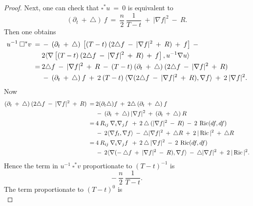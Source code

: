 \documentclass[12pt]{amsart}
\newcommand{\Ric}{\operatorname{Ric}}
\numberwithin{equation}{section}
\theoremstyle{plain}
\theoremstyle{definition}
\theoremstyle{remark}
\begin{document}
\begin{proof}
Next, one can check that $\square^* u \: = \: 0$ is equivalent to
\begin{equation}
(\partial_t \: + \: \triangle) \: f \: = \: \frac{n}{2} \: \frac{1}{T-t}
\: + \: |\nabla f|^2 \: - \: R.
\end{equation}
Then one obtains
\begin{align}
u^{-1} \: \square^* v \: = \: &
- \: (\partial_t \: + \: \triangle) \: \left[ (T - t) \:
(2 \triangle f \: - \: |\nabla f|^2 \: + \: R) \: + \: f \right] 
\: - \\
& 2 \langle \nabla \left[ (T - t) \:
(2 \triangle f \: - \: |\nabla f|^2 \: + \: R) \: + \: f \right], 
u^{-1} \nabla u \rangle \notag \\
\: = \: & 2 \triangle f \: - \: |\nabla f|^2 \: + \: R \: - \:
(T-t) \: (\partial_t \: + \: \triangle) \: 
(2 \triangle f \: - \: |\nabla f|^2 \: + \: R) \notag \\
&- \: 
(\partial_t \: + \: \triangle) \: f  \: + \:
2 \: (T-t) \: \langle \nabla
(2 \triangle f \: - \: |\nabla f|^2 \: + \: R), 
\nabla f \rangle \: + \: 2 \: |\nabla f|^2. \notag
\end{align}
Now
\begin{align}
(\partial_t \: + \: \triangle) \: 
(2 \triangle f \: - \: |\nabla f|^2 \: + \: R) \: = \:
& 2 (\partial_t \triangle) f \: + \: 2 \triangle \:
(\partial_t \: + \: \triangle) \: f \\
& - \: (\partial_t \: + \: \triangle) \: |\nabla f|^2 \: + \: 
(\partial_t \: + \: \triangle) \: R \notag \\
 \: = \: & 4 \: R_{ij} \: \nabla_i \nabla_j f \: \: + \:
2 \: \triangle \: (|\nabla f|^2 \: - \: R) \: - \: 2 \:
\Ric(df, df) \notag \\
& - \: 2 \langle \nabla f_t, \nabla f \rangle \: - \:
\triangle |\nabla f|^2 
\: + \: \triangle R \: + \: 2 \: |\Ric|^2 \: + \: \triangle R \notag \\
 \: = \: & 4 \: R_{ij} \: \nabla_i \nabla_j f \: \: + \:
2 \: \triangle \: |\nabla f|^2 \: - \: 2 \:
\Ric(df, df) \notag \\
& - \: 2 \langle \nabla 
(- \: \triangle f \: + \: |\nabla f|^2 \: - \: R),
\nabla f \rangle \: - \:
\triangle |\nabla f|^2  \: + \: 2 \: |\Ric|^2. \notag
\end{align}
Hence the term in $u^{-1} \: \square^* v$ proportionate to
$(T-t)^{-1}$ is
\begin{equation}
- \: \frac{n}{2} \: \frac{1}{T-t}.
\end{equation}
The term proportionate to $(T-t)^0$ is
\begin{equation}

\end{equation}
\end{proof}
\end{document}
